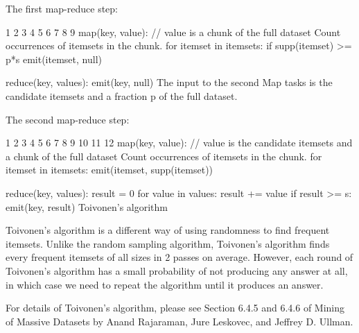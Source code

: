 The first map-reduce step:

1
2
3
4
5
6
7
8
9
map(key, value):
    // value is a chunk of the full dataset
    Count occurrences of itemsets in the chunk.
    for itemset in itemsets:
        if supp(itemset) >= p*s
            emit(itemset, null)
  
reduce(key, values):
    emit(key, null)
The input to the second Map tasks is the candidate itemsets and a fraction p of the full dataset.

The second map-reduce step:

1
2
3
4
5
6
7
8
9
10
11
12
map(key, value):
    // value is the candidate itemsets and a chunk of the full dataset
    Count occurrences of itemsets in the chunk.
    for itemset in itemsets:
        emit(itemset, supp(itemset))
  
reduce(key, values):
    result = 0
    for value in values:
        result += value
    if result >= s:
        emit(key, result)
Toivonen’s algorithm

Toivonen’s algorithm is a different way of using randomness to find frequent itemsets. Unlike the random sampling algorithm, Toivonen’s algorithm finds every frequent itemsets of all sizes in 2 passes on average. However, each round of Toivonen’s algorithm has a small probability of not producing any answer at all, in which case we need to repeat the algorithm until it produces an answer.

For details of Toivonen’s algorithm, please see Section 6.4.5 and 6.4.6 of Mining of Massive Datasets by Anand Rajaraman, Jure Leskovec, and Jeffrey D. Ullman.
